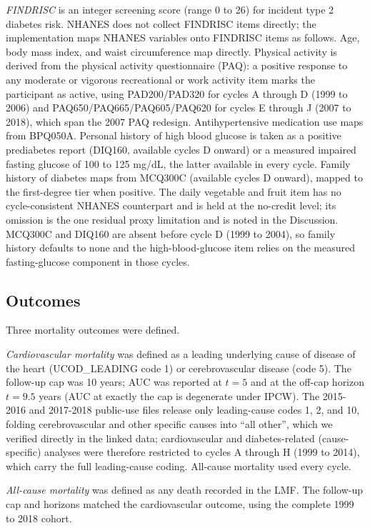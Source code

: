 \documentclass[11pt]{article}
\begin{document}
\emph{FINDRISC} \citep{lindstrom2003findrisc} is an integer screening score (range 0 to 26) for incident type 2 diabetes risk. NHANES does not collect FINDRISC items directly; the implementation maps NHANES variables onto FINDRISC items as follows. Age, body mass index, and waist circumference map directly. Physical activity is derived from the physical activity questionnaire (PAQ): a positive response to any moderate or vigorous recreational or work activity item marks the participant as active, using PAD200/PAD320 for cycles A through D (1999 to 2006) and PAQ650/PAQ665/PAQ605/PAQ620 for cycles E through J (2007 to 2018), which span the 2007 PAQ redesign. Antihypertensive medication use maps from BPQ050A. Personal history of high blood glucose is taken as a positive prediabetes report (DIQ160, available cycles D onward) or a measured impaired fasting glucose of 100 to 125 mg/dL, the latter available in every cycle. Family history of diabetes maps from MCQ300C (available cycles D onward), mapped to the first-degree tier when positive. The daily vegetable and fruit item has no cycle-consistent NHANES counterpart and is held at the no-credit level; its omission is the one residual proxy limitation and is noted in the Discussion. MCQ300C and DIQ160 are absent before cycle D (1999 to 2004), so family history defaults to none and the high-blood-glucose item relies on the measured fasting-glucose component in those cycles.

\subsection*{Outcomes}

Three mortality outcomes were defined.

\emph{Cardiovascular mortality} was defined as a leading underlying cause of disease of the heart (UCOD\_LEADING code 1) or cerebrovascular disease (code 5). The follow-up cap was 10 years; AUC was reported at $t = 5$ and at the off-cap horizon $t = 9.5$ years (AUC at exactly the cap is degenerate under IPCW). The 2015-2016 and 2017-2018 public-use files release only leading-cause codes 1, 2, and 10, folding cerebrovascular and other specific causes into ``all other'', which we verified directly in the linked data; cardiovascular and diabetes-related (cause-specific) analyses were therefore restricted to cycles A through H (1999 to 2014), which carry the full leading-cause coding. All-cause mortality used every cycle.

\emph{All-cause mortality} was defined as any death recorded in the LMF. The follow-up cap and horizons matched the cardiovascular outcome, using the complete 1999 to 2018 cohort.
\end{document}
